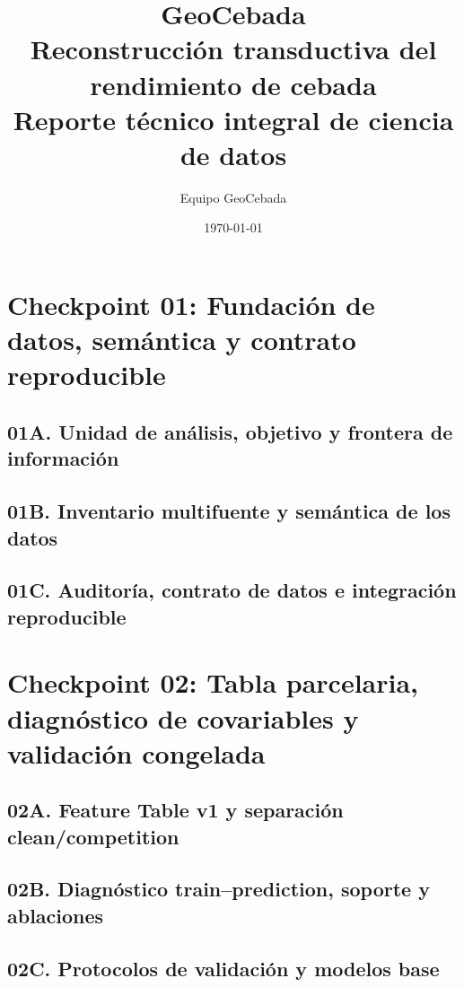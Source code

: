 \documentclass[11pt,oneside]{report}
\title{\textbf{GeoCebada}\\[0.4em]
Reconstrucción transductiva del rendimiento de cebada\\
\large Reporte técnico integral de ciencia de datos}
\author{Equipo GeoCebada}
\date{\today}
\begin{document}
\maketitle
\begin{abstract}

\end{abstract}
\clearpage

\clearpage
\tableofcontents
\clearpage
\listoftables
\clearpage
\listoffigures
\clearpage
{}
\chapter{Checkpoint 01: Fundación de datos, semántica y contrato reproducible}
\label{chap:checkpoint01}
\section{01A. Unidad de análisis, objetivo y frontera de información}
\label{sec:checkpoint01a}

\section{01B. Inventario multifuente y semántica de los datos}
\label{sec:checkpoint01b}

\section{01C. Auditoría, contrato de datos e integración reproducible}
\label{sec:checkpoint01c}

\chapter{Checkpoint 02: Tabla parcelaria, diagnóstico de covariables y validación congelada}
\label{chap:checkpoint02}
\section{02A. Feature Table v1 y separación clean/competition}
\label{sec:checkpoint02a}

\section{02B. Diagnóstico train--prediction, soporte y ablaciones}
\label{sec:checkpoint02b}

\section{02C. Protocolos de validación y modelos base}
\label{sec:checkpoint02c}

\end{document}
